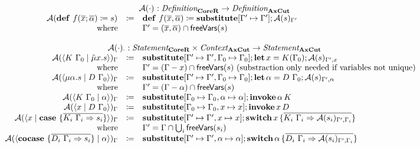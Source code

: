 \[
  \begin{array}{rcll}
    \multicolumn{4}{c}{\axcutify{\cdot}{} : \emph{Definition}_{\targetred{}} \rightarrow \emph{Definition}_{\machinelang{}}}\\
    \axcutify{\defi{f(\overline{x}; \overline{\alpha})}{s}}{} & \coloneq & \defi{f(\overline{x}, \overline{\alpha})}{\substitute{\Gamma' \mapsto \Gamma'}{\axcutify{s}{\Gamma'}}} & \\
    \text{where} &  & \Gamma' = (\overline{x}, \overline{\alpha}) \cap \free{s} & \\
    \\
    \multicolumn{4}{c}{\axcutify{\cdot}{\cdot} : \emph{Statement}_{\targetred{}} \times \emph{Context}_{\machinelang{}} \rightarrow \emph{Statement}_{\machinelang{}}}\\
    \axcutify{\cut{K\ \Gamma_0}{\tilde{\mu}x.s}}{\Gamma} & \coloneq & \substitute{\Gamma' \mapsto \Gamma', \Gamma_0 \mapsto \Gamma_0}{\letac{x}{K(\Gamma_0)}{\axcutify{s}{\Gamma', x}}} & \\
    \text{where} &  & \Gamma' = (\Gamma - x) \cap \free{s} \text{ (substraction only needed if variables not unique)} & \\
    \axcutify{\cut{\mu\alpha.s}{D\ \Gamma_0}}{\Gamma} & \coloneq & \substitute{\Gamma' \mapsto \Gamma', \Gamma_0 \mapsto \Gamma_0}{\letac{\alpha}{D\ \Gamma_0}{\axcutify{s}{\Gamma', \alpha}}} & \\
    \text{where} &  & \Gamma' = (\Gamma - \alpha) \cap \free{s} & \\
    \axcutify{\cut{K\ \Gamma_0}{\alpha}}{\Gamma} & \coloneq & \substitute{\Gamma_0 \mapsto \Gamma_0, \alpha \mapsto \alpha}{\invoke{\alpha}{K}} & \\
    \axcutify{\cut{x}{D\ \Gamma_0}}{\Gamma} & \coloneq & \substitute{\Gamma_0 \mapsto \Gamma_0, x \mapsto x}{\invoke{x}{D}} & \\
    \axcutify{\cut{x}{\case{\overline{K_i\ \Gamma_i \Rightarrow s_i}}}}{\Gamma} & \coloneq & \substitute{\Gamma' \mapsto \Gamma', x \mapsto x}{\switch{x}{\bra{\overline{K_i\ \Gamma_i \Rightarrow \axcutify{s_i}{\Gamma', \Gamma_i}}}}} & \\
    \text{where} &  & \Gamma' = \Gamma \cap \bigcup_i \free{s_i} & \\
    \axcutify{\cut{\cocase{\overline{D_i\ \Gamma_i \Rightarrow s_i}}}{\alpha}}{\Gamma} & \coloneq & \substitute{\Gamma' \mapsto \Gamma', \alpha \mapsto \alpha}{\switch{\alpha}{\bra{\overline{D_i\ \Gamma_i \Rightarrow \axcutify{s_i}{\Gamma', \Gamma_i}}}}} & \\

\end{array}\]
